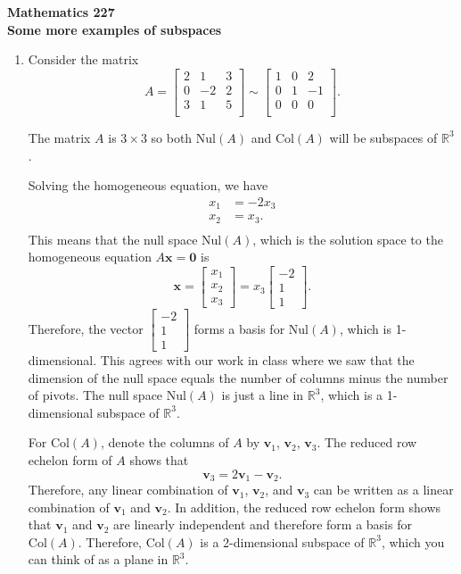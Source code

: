\documentclass[12pt]{article}
\newcommand{\vvec}{{\mathbf v}}
\newcommand{\xvec}{{\mathbf x}}
\newcommand{\zerovec}{{\mathbf 0}}
\newcommand{\real}{{\mathbb R}}
\newcommand{\threevec}[3]{\left[\begin{array}{r}#1 \\ #2 \\ #3
  \end{array}\right]}
\newcommand{\col}{\text{Col}}
\newcommand{\nul}{\text{Nul}}
\begin{document}
\noindent
{\bf Mathematics 227} \\ 
{\bf Some more examples of subspaces}

\bigskip
\begin{enumerate}
\item Consider the matrix
  $$
  A =
  \left[
    \begin{array}{ccc}
      2 & 1 & 3\\
      0 & -2 & 2 \\
      3 & 1 & 5 \\
    \end{array}
  \right]
  \sim
  \left[
    \begin{array}{ccc}
      1 & 0 & 2 \\
      0 & 1 & -1 \\
      0 & 0 & 0 \\
    \end{array}
  \right].
  $$

  The matrix $A$ is $3\times 3$ so both $\nul(A)$ and $\col(A)$ will
  be subspaces of $\real^3$.

  Solving the homogeneous equation, we have
  $$
  \begin{aligned}
    x_1 & = -2x_3 \\
    x_2 & = x_3. \\
  \end{aligned}
  $$
  This means that the null space $\nul(A)$, which is the
  solution space to the homogeneous equation $A\xvec=\zerovec$ is
  $$
  \xvec = \threevec{x_1}{x_2}{x_3} = x_3\threevec{-2}11.
  $$
  Therefore, the vector $\threevec{-2}11$ forms a basis for $\nul(A)$,
  which is 1-dimensional.  This agrees with our work in class where we
  saw that the dimension of the null space equals the number of
  columns minus the number of pivots.  The null space $\nul(A)$ is
  just a line in $\real^3$, which is a 1-dimensional subspace of
  $\real^3$.

  \medskip
  For $\col(A)$, denote the columns of $A$ by $\vvec_1$, $\vvec_2$,
  $\vvec_3$.  The reduced row echelon form of $A$ shows that
  $$
  \vvec_3 = 2\vvec_1 - \vvec_2.
  $$
  Therefore, any linear combination of $\vvec_1$, $\vvec_2$, and
  $\vvec_3$ can be written as a linear combination of $\vvec_1$ and
  $\vvec_2$.  In addition, the reduced row echelon form shows that
  $\vvec_1$ and $\vvec_2$ are linearly independent and therefore form a
  basis for $\col(A)$.  Therefore, $\col(A)$ is a 2-dimensional
  subspace of $\real^3$, which you can think of as a plane in
  $\real^3$.


\end{enumerate}
\end{document}
